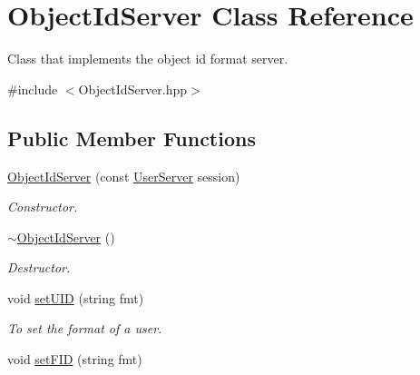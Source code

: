 \hypertarget{classObjectIdServer}{
\section{ObjectIdServer Class Reference}
\label{classObjectIdServer}
}


Class that implements the object id format server.  




{\ttfamily \#include $<$ObjectIdServer.hpp$>$}

\subsection*{Public Member Functions}
\begin{DoxyCompactItemize}
\item 
\hypertarget{classObjectIdServer_a1abd00e57190f773dd902da86796ded1}{
\hyperlink{classObjectIdServer_a1abd00e57190f773dd902da86796ded1}{ObjectIdServer} (const \hyperlink{classUserServer}{UserServer} session)}
\label{classObjectIdServer_a1abd00e57190f773dd902da86796ded1}

\begin{DoxyCompactList}\small\item\em Constructor. \item\end{DoxyCompactList}\item 
\hypertarget{classObjectIdServer_a393451d822bad59db4d6d8e4c5b30042}{
\hyperlink{classObjectIdServer_a393451d822bad59db4d6d8e4c5b30042}{$\sim$ObjectIdServer} ()}
\label{classObjectIdServer_a393451d822bad59db4d6d8e4c5b30042}

\begin{DoxyCompactList}\small\item\em Destructor. \item\end{DoxyCompactList}\item 
\hypertarget{classObjectIdServer_a5f8fd253e9944db4debe189ab1eb14fa}{
void \hyperlink{classObjectIdServer_a5f8fd253e9944db4debe189ab1eb14fa}{setUID} (string fmt)}
\label{classObjectIdServer_a5f8fd253e9944db4debe189ab1eb14fa}

\begin{DoxyCompactList}\small\item\em To set the format of a user. \item\end{DoxyCompactList}\item 
\hypertarget{classObjectIdServer_a06e46159c9f152bbb83d3382f11dff3b}{
void \hyperlink{classObjectIdServer_a06e46159c9f152bbb83d3382f11dff3b}{setFID} (string fmt)}
\label{classObjectIdServer_a06e46159c9f152bbb83d3382f11dff3b}


\end{DoxyCompactItemize}
